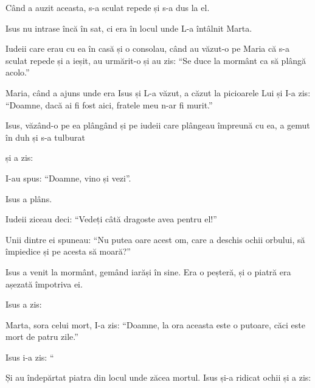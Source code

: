 {\par }{\PP {}Când a auzit aceasta, s-a sculat repede și s-a dus la el.

Isus nu intrase încă în sat, ci era în locul unde L-a întâlnit Marta.

Iudeii care erau cu ea în casă și o consolau, când au văzut-o pe Maria că s-a sculat repede și a ieșit, au urmărit-o și au zis: “Se duce la mormânt ca să plângă acolo.”


\par }{\PP {}Maria, când a ajuns unde era Isus și L-a văzut, a căzut la picioarele Lui și I-a zis: “Doamne, dacă ai fi fost aici, fratele meu n-ar fi murit.”


\par }{\PP {}Isus, văzând-o pe ea plângând și pe iudeii care plângeau împreună cu ea, a gemut în duh și s-a tulburat

și a zis:
{}

\par }{\PP I-au spus: “Doamne, vino și vezi”.


\par }{\PP {}Isus a plâns.


\par }{\PP {}Iudeii ziceau deci: “Vedeți câtă dragoste avea pentru el!”

Unii dintre ei spuneau: “Nu putea oare acest om, care a deschis ochii orbului, să împiedice și pe acesta să moară?”


\par }{\PP {}Isus a venit la mormânt, gemând iarăși în sine. Era o peșteră, și o piatră era așezată împotriva ei.

Isus a zis:
{}

\par }{\PP Marta, sora celui mort, I-a zis: “Doamne, la ora aceasta este o putoare, căci este mort de patru zile.”


\par }{\PP {}Isus i-a zis: “{}


\par }{\PP {}Și au îndepărtat piatra din locul unde zăcea mortul. Isus și-a ridicat ochii și a zis:
{}


}
